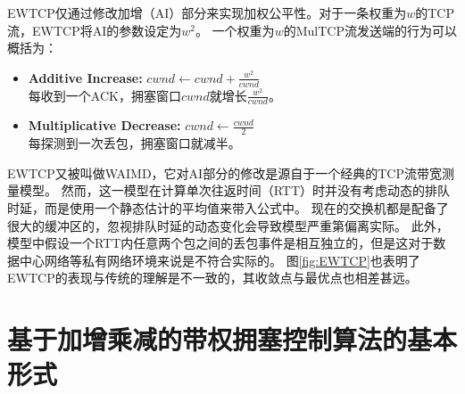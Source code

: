 \documentclass[winfonts]{njuthesis}
\begin{document}
EWTCP仅通过修改加增（AI）部分来实现加权公平性。对于一条权重为$w$的TCP流，EWTCP将AI的参数设定为$w^2$。
一个权重为$w$的MulTCP流发送端的行为可以概括为：
\begin{itemize}
  \item {\bf Additive Increase:} $cwnd \leftarrow cwnd + \frac{w^2}{cwnd}$ \\
  每收到一个ACK，拥塞窗口$cwnd$就增长$\frac{w^2}{cwnd}$。
  \item {\bf Multiplicative Decrease:} $cwnd \leftarrow \frac{cwnd}{2}$ \\
  每探测到一次丢包，拥塞窗口就减半。
\end{itemize}

EWTCP又被叫做WAIMD\cite{Honda2009EWTCP}，它对AI部分的修改是源自于一个经典的TCP流带宽测量模型\cite{padhye1998modeling}。
然而，这一模型在计算单次往返时间（RTT）时并没有考虑动态的排队时延，而是使用一个静态估计的平均值来带入公式中。
现在的交换机都是配备了很大的缓冲区的\cite{Jim2012Bufferbloat}，忽视排队时延的动态变化会导致模型严重第偏离实际。
此外，模型中假设一个RTT内任意两个包之间的丢包事件是相互独立的，但是这对于数据中心网络等私有网络环境来说是不符合实际的。
图\ref{fig:EWTCP}也表明了EWTCP的表现与传统的理解是不一致的，其收敛点与最优点也相差甚远。

\section{基于加增乘减的带权拥塞控制算法的基本形式}
\end{document}
